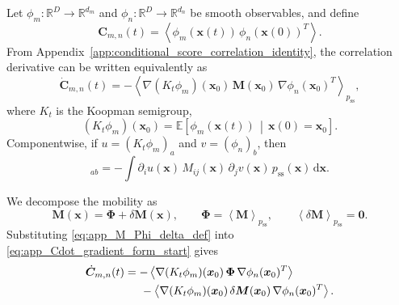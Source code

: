\documentclass[11pt,twoside,fleqn]{article}
\renewcommand{\d}{\mathrm{d}}
\begin{document}
Let $\phi_m:\mathbb{R}^D\to\mathbb{R}^{d_m}$ and $\phi_n:\mathbb{R}^D\to\mathbb{R}^{d_n}$ be smooth observables, and define
\begin{equation}
    \bm{C}_{m,n}(t)
    =
    \left\langle
        \phi_m(\bm{x}(t))\,
        \phi_n(\bm{x}(0))^T
    \right\rangle .
    \label{eq:app_mean_Cmn_def}
\end{equation}
From Appendix~\ref{app:conditional_score_correlation_identity}, the correlation derivative can be written equivalently as
\begin{equation}
    \dot{\bm{C}}_{m,n}(t)
    =
    -
    \left\langle
        \nabla(K_t\phi_m)(\bm{x}_0)\,
        \bm{M}(\bm{x}_0)\,
        \nabla\phi_n(\bm{x}_0)^T
    \right\rangle_{p_{\mathrm{ss}}},
    \label{eq:app_Cdot_gradient_form_start}
\end{equation}
where $K_t$ is the Koopman semigroup,
\begin{equation}
    (K_t\phi_m)(\bm{x}_0)
    =
    \mathbb{E}
    \left[
        \phi_m(\bm{x}(t))
        \,\middle|\,
        \bm{x}(0)=\bm{x}_0
    \right].
    \label{eq:app_Kt_phi_def_mean}
\end{equation}
Componentwise, if $u=(K_t\phi_m)_a$ and $v=(\phi_n)_b$, then
\begin{equation}
    [\dot{\bm{C}}_{m,n}(t)]_{ab}
    =
    -
    \int
        \partial_i u(\bm{x})\,
        M_{ij}(\bm{x})\,
        \partial_j v(\bm{x})\,
        p_{\mathrm{ss}}(\bm{x})\,\d\bm{x}.
    \label{eq:app_Cdot_component_start}
\end{equation}

We decompose the mobility as
\begin{equation}
    \bm{M}(\bm{x})
    =
    \bm{\Phi}
    +
    \delta\bm{M}(\bm{x}),
    \qquad
    \bm{\Phi}
    =
    \left\langle
        \bm{M}
    \right\rangle_{p_{\mathrm{ss}}},
    \qquad
    \left\langle
        \delta\bm{M}
    \right\rangle_{p_{\mathrm{ss}}}
    =
    \bm{0}.
    \label{eq:app_M_Phi_delta_def}
\end{equation}
Substituting \eqref{eq:app_M_Phi_delta_def} into \eqref{eq:app_Cdot_gradient_form_start} gives
\begin{equation}
\begin{aligned}
    \dot{\bm{C}}_{m,n}(t)
    &=
    -
    \left\langle
        \nabla(K_t\phi_m)(\bm{x}_0)\,
        \bm{\Phi}\,
        \nabla\phi_n(\bm{x}_0)^T
    \right\rangle
    \\
    &\hspace{0.5cm}
    -
    \left\langle
        \nabla(K_t\phi_m)(\bm{x}_0)\,
        \delta\bm{M}(\bm{x}_0)\,
        \nabla\phi_n(\bm{x}_0)^T
    \right\rangle .
\end{aligned}
\label{eq:app_Cdot_Phi_delta_gradient}
\end{equation}
\end{document}
